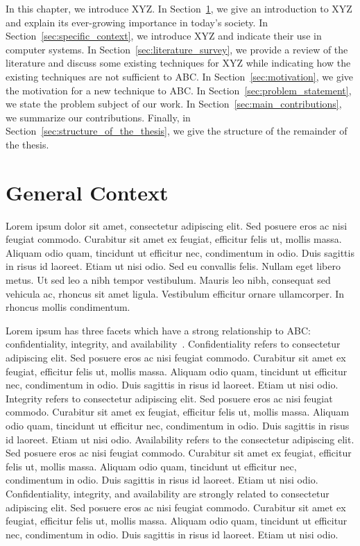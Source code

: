 In this chapter, we introduce XYZ. In Section~\ref{sec:general_context}, we give an introduction to XYZ and explain its ever-growing importance in today's society. In Section~\ref{sec:specific_context}, we introduce XYZ and indicate their use in computer systems. In Section~\ref{sec:literature_survey}, we provide a review of the literature and discuss some existing techniques for XYZ while indicating how the existing techniques are not sufficient to ABC. In Section~\ref{sec:motivation}, we give the motivation for a new technique to ABC. In Section~\ref{sec:problem_statement}, we state the problem subject of our work. In Section~\ref{sec:main_contributions}, we summarize our contributions. Finally, in Section~\ref{sec:structure_of_the_thesis}, we give the structure of the remainder of the thesis.

\section{General Context}
\label{sec:general_context}

Lorem ipsum dolor sit amet, consectetur adipiscing elit. Sed posuere eros ac nisi feugiat commodo. Curabitur sit amet ex feugiat, efficitur felis ut, mollis massa. Aliquam odio quam, tincidunt ut efficitur nec, condimentum in odio. Duis sagittis in risus id laoreet. Etiam ut nisi odio. Sed eu convallis felis. Nullam eget libero metus. Ut sed leo a nibh tempor vestibulum. Mauris leo nibh, consequat sed vehicula ac, rhoncus sit amet ligula. Vestibulum efficitur ornare ullamcorper. In rhoncus mollis condimentum. \newline

Lorem ipsum has three facets which have a strong relationship to ABC: confidentiality, integrity, and availability~\cite{Bishop2002aa}. Confidentiality refers to consectetur adipiscing elit. Sed posuere eros ac nisi feugiat commodo. Curabitur sit amet ex feugiat, efficitur felis ut, mollis massa. Aliquam odio quam, tincidunt ut efficitur nec, condimentum in odio. Duis sagittis in risus id laoreet. Etiam ut nisi odio. Integrity refers to consectetur adipiscing elit. Sed posuere eros ac nisi feugiat commodo. Curabitur sit amet ex feugiat, efficitur felis ut, mollis massa. Aliquam odio quam, tincidunt ut efficitur nec, condimentum in odio. Duis sagittis in risus id laoreet. Etiam ut nisi odio. Availability refers to the consectetur adipiscing elit. Sed posuere eros ac nisi feugiat commodo. Curabitur sit amet ex feugiat, efficitur felis ut, mollis massa. Aliquam odio quam, tincidunt ut efficitur nec, condimentum in odio. Duis sagittis in risus id laoreet. Etiam ut nisi odio. Confidentiality, integrity, and availability are strongly related to consectetur adipiscing elit. Sed posuere eros ac nisi feugiat commodo. Curabitur sit amet ex feugiat, efficitur felis ut, mollis massa. Aliquam odio quam, tincidunt ut efficitur nec, condimentum in odio. Duis sagittis in risus id laoreet. Etiam ut nisi odio. \newline

